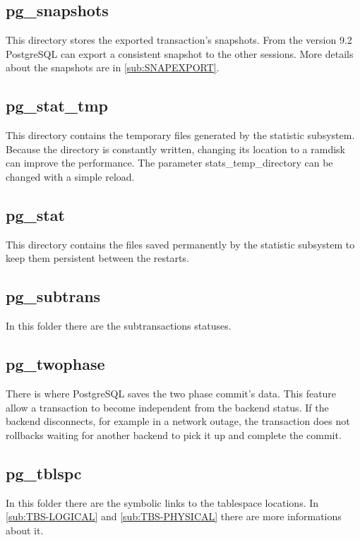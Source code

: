 \subsection{pg\_snapshots}

This directory stores the exported transaction's snapshots. From the version
9.2 PostgreSQL can export a consistent snapshot to the other sessions. More
details about the snapshots are in \ref{sub:SNAPEXPORT}.

\subsection{pg\_stat\_tmp}

This directory contains the temporary files generated by the statistic
subsystem. Because the directory is constantly written, changing its location
to a ramdisk can improve the performance. The parameter stats\_temp\_directory
can be changed with a simple reload.

\subsection{pg\_stat}

This directory contains the files saved permanently by the statistic subsystem
to keep them persistent between the restarts.

\subsection{pg\_subtrans}

In this folder there are the subtransactions statuses.

\subsection{pg\_twophase}

There is where PostgreSQL saves the two phase commit's data. This feature allow
a transaction to become independent from the backend status. If the backend
disconnects, for example in a network outage, the transaction does not
rollbacks waiting for another backend to pick it up and complete the commit.

\subsection{pg\_tblspc}

\label{sub:TABLESPACE}

In this folder there are the symbolic links to the tablespace locations. In
\ref{sub:TBS-LOGICAL} and \ref{sub:TBS-PHYSICAL} there are more informations
about it.
